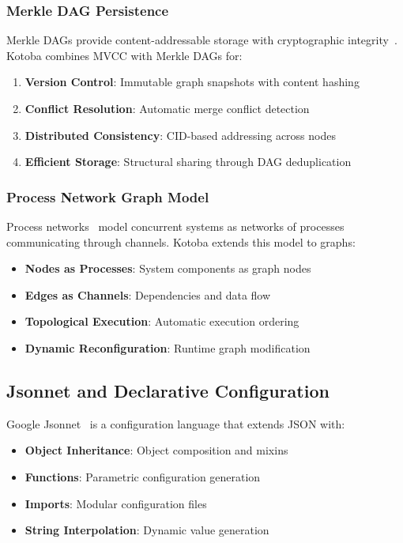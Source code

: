 \documentclass[11pt,a4paper]{article}
\begin{document}
\subsubsection{Merkle DAG Persistence}
\label{subsubsec:merkle}

Merkle DAGs provide content-addressable storage with cryptographic integrity~\cite{merkle_dag}. Kotoba combines MVCC with Merkle DAGs for:

\begin{enumerate}
\item \textbf{Version Control}: Immutable graph snapshots with content hashing
\item \textbf{Conflict Resolution}: Automatic merge conflict detection
\item \textbf{Distributed Consistency}: CID-based addressing across nodes
\item \textbf{Efficient Storage}: Structural sharing through DAG deduplication
\end{enumerate}

\subsubsection{Process Network Graph Model}
\label{subsubsec:process_network}

Process networks~\cite{kahn1974} model concurrent systems as networks of processes communicating through channels. Kotoba extends this model to graphs:

\begin{itemize}
\item \textbf{Nodes as Processes}: System components as graph nodes
\item \textbf{Edges as Channels}: Dependencies and data flow
\item \textbf{Topological Execution}: Automatic execution ordering
\item \textbf{Dynamic Reconfiguration}: Runtime graph modification
\end{itemize}

\subsection{Jsonnet and Declarative Configuration}
\label{subsec:jsonnet}

Google Jsonnet~\cite{jsonnet} is a configuration language that extends JSON with:
\begin{itemize}
\item \textbf{Object Inheritance}: Object composition and mixins
\item \textbf{Functions}: Parametric configuration generation
\item \textbf{Imports}: Modular configuration files
\item \textbf{String Interpolation}: Dynamic value generation
\end{itemize}
\end{document}
